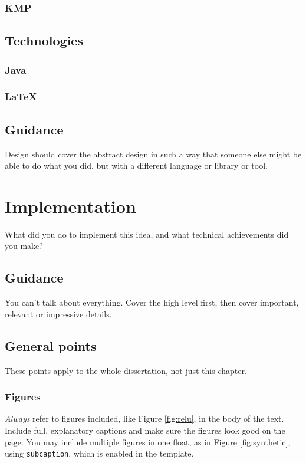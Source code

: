 \documentclass{l4proj}
\begin{document}
\subsection{KMP}

\section{Technologies}

\subsection{Java}
\subsection{LaTeX}

\section{Guidance}
Design should cover the abstract design in such a way that someone else might be able to do what you did, but with a different language or library or tool.

\chapter{Implementation}
\label{chap:imp}
What did you do to implement this idea, and what technical achievements did you make?
\section{Guidance}
You can't talk about everything. Cover the high level first, then cover important, relevant or impressive details.



\section{General points}

These points apply to the whole dissertation, not just this chapter.



\subsection{Figures}
\emph{Always} refer to figures included, like Figure \ref{fig:relu}, in the body of the text. Include full, explanatory captions and make sure the figures look good on the page.
You may include multiple figures in one float, as in Figure \ref{fig:synthetic}, using \texttt{subcaption}, which is enabled in the template.
\end{document}
